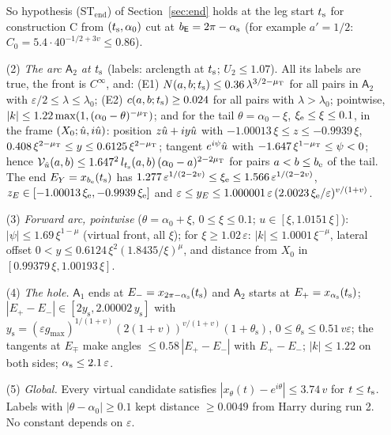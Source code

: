\begin{proposition}
\begin{enumerate}
\begin{itemize}
\end{itemize}
So hypothesis \textup{(ST$_{\mathrm{end}}$)} of Section~\ref{sec:end} holds at the leg start $\Bts$ for construction C from
$(\Bts,\alpha_0)$ cut at $\EbE=2\pi-\STas$ (for example $a'=1/2$: $C_0=5.4\cdot40^{-1/2+3v}\le0.86$).
\item[(2)] \emph{The arc $\mathsf A_2$ at $\Bts$} (labels: arclength at $\Bts$; $U_2\le1.07$). All its labels are true, the front is
$C^\infty$, and: \textup{(E1)} $N(a,b;t_{\mathrm s})\le0.36\,\lambda^{3/2-\mu_{\mathrm T}}$ for all pairs in $\mathsf A_2$ with
$\varepsilon/2\le\lambda\le\lambda_0$; \textup{(E2)} $c(a,b;t_{\mathrm s})\ge0.024$ for all pairs with $\lambda>\lambda_0$; pointwise,
$|k|\le1.22\max(1,(\alpha_0-\theta)^{-\mu_{\mathrm T}})$; and for the tail $\theta=\alpha_0-\xi$, $\xi_{\mathrm e}\le\xi\le0.1$, in the frame
$(X_0;\hat u,i\hat u)$: position $z\hat u+iy\hat u$ with $-1.00013\,\xi\le z\le-0.9939\,\xi$, $0.408\,\xi^{2-\mu_{\mathrm T}}\le y\le0.6125\,\xi^{2-\mu_{\mathrm T}}$;
tangent $e^{i\psi}\hat u$ with $-1.647\,\xi^{1-\mu_{\mathrm T}}\le\psi<0$; hence
$\mathcal V_{\hat u}(a,b)\le1.647^2\,l_{t_{\mathrm s}}(a,b)\,(\alpha_0-a)^{2-2\mu_{\mathrm T}}$ for pairs $a<b\le b_{\mathrm e}$ of the tail. The end $E_Y=x_{b_{\mathrm e}}(t_{\mathrm s})$ has
$1.277\,\varepsilon^{1/(2-2v)}\le\xi_{\mathrm e}\le1.566\,\varepsilon^{1/(2-2v)}$, $z_E\in[-1.00013\,\xi_{\mathrm e},-0.9939\,\xi_{\mathrm e}]$ and
$\varepsilon\le y_E\le1.000001\,\varepsilon\,(2.0023\,\xi_{\mathrm e}/\varepsilon)^{v/(1+v)}$.
\item[(3)] \emph{Forward arc, pointwise} ($\theta=\alpha_0+\xi$, $0\le\xi\le0.1$; $u\in[\xi,1.0151\,\xi]$):
$|\psi|\le1.69\,\xi^{1-\mu}$ (virtual front, all $\xi$); for $\xi\ge1.02\,\varepsilon$: $|k|\le1.0001\,\xi^{-\mu}$, lateral offset
$0<y\le0.6124\,\xi^2(1.8435/\xi)^\mu$, and distance from $X_0$ in $[0.99379\,\xi,1.00193\,\xi]$.
\item[(4)] \emph{The hole.} $\mathsf A_1$ ends at $E_-=x_{2\pi-\alpha_{\mathrm s}}(t_{\mathrm s})$ and $\mathsf A_2$ starts at $E_+=x_{\alpha_{\mathrm s}}(t_{\mathrm s})$;
$|E_+-E_-|\in[2y_{\mathrm s},2.00002\,y_{\mathrm s}]$ with
$y_{\mathrm s}=(\varepsilon g_{\max})^{1/(1+v)}(2(1+v))^{v/(1+v)}(1+\theta_{\mathrm s})$, $0\le\theta_{\mathrm s}\le0.51\,v\varepsilon$; the
tangents at $E_\mp$ make angles $\le0.58\,|E_+-E_-|$ with $E_+-E_-$; $|k|\le1.22$ on both sides; $\alpha_{\mathrm s}\le2.1\,\varepsilon$.
\item[(5)] \emph{Global.} Every virtual candidate satisfies $|x_\theta(t)-e^{i\theta}|\le3.74\,v$ for $t\le t_{\mathrm s}$. Labels with
$|\theta-\alpha_0|\ge0.1$ kept distance $\ge0.0049$ from Harry during run 2. No constant depends on $\varepsilon$.
\end{enumerate}
\end{proposition}
